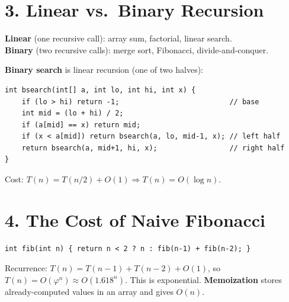 \documentclass[11pt]{article}
\begin{document}
\section*{3. Linear vs.\ Binary Recursion}

\textbf{Linear} (one recursive call): array sum, factorial, linear search.\\
\textbf{Binary} (two recursive calls): merge sort, Fibonacci, divide-and-conquer.

\textbf{Binary search} is linear recursion (one of two halves):
\begin{lstlisting}
int bsearch(int[] a, int lo, int hi, int x) {
    if (lo > hi) return -1;                          // base
    int mid = (lo + hi) / 2;
    if (a[mid] == x) return mid;
    if (x < a[mid]) return bsearch(a, lo, mid-1, x); // left half
    return bsearch(a, mid+1, hi, x);                 // right half
}
\end{lstlisting}
Cost: $T(n) = T(n/2) + O(1) \Rightarrow T(n) = O(\log n)$.

\section*{4. The Cost of Naive Fibonacci}

\begin{lstlisting}
int fib(int n) { return n < 2 ? n : fib(n-1) + fib(n-2); }
\end{lstlisting}
Recurrence: $T(n) = T(n-1)+T(n-2)+O(1)$, so $T(n) = O(\varphi^n) \approx O(1.618^n)$. This is exponential. \textbf{Memoization} stores already-computed values in an array and gives $O(n)$.
\end{document}

